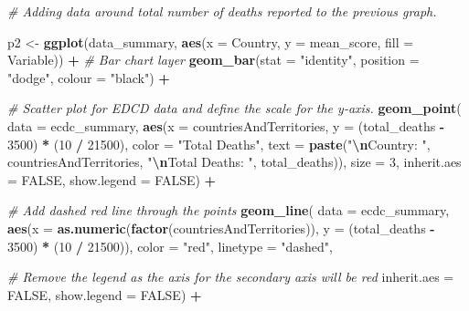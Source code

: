 \documentclass[
]{article}
\newenvironment{Shaded}{\begin{snugshade}}{\end{snugshade}}
\newcommand{\AttributeTok}[1]{\textcolor[rgb]{0.13,0.29,0.53}{#1}}
\newcommand{\CommentTok}[1]{\textcolor[rgb]{0.56,0.35,0.01}{\textit{#1}}}
\newcommand{\ConstantTok}[1]{\textcolor[rgb]{0.56,0.35,0.01}{#1}}
\newcommand{\DecValTok}[1]{\textcolor[rgb]{0.00,0.00,0.81}{#1}}
\newcommand{\FunctionTok}[1]{\textcolor[rgb]{0.13,0.29,0.53}{\textbf{#1}}}
\newcommand{\NormalTok}[1]{#1}
\newcommand{\OtherTok}[1]{\textcolor[rgb]{0.56,0.35,0.01}{#1}}
\newcommand{\SpecialCharTok}[1]{\textcolor[rgb]{0.81,0.36,0.00}{\textbf{#1}}}
\newcommand{\StringTok}[1]{\textcolor[rgb]{0.31,0.60,0.02}{#1}}
\begin{document}
\begin{Shaded}
\begin{Highlighting}[]
  \CommentTok{\# Adding data around total number of deaths reported to the previous graph. }

\NormalTok{p2 }\OtherTok{\textless{}{-}} \FunctionTok{ggplot}\NormalTok{(data\_summary, }\FunctionTok{aes}\NormalTok{(}\AttributeTok{x =}\NormalTok{ Country, }\AttributeTok{y =}\NormalTok{ mean\_score, }\AttributeTok{fill =}\NormalTok{ Variable)) }\SpecialCharTok{+}
  \CommentTok{\# Bar chart layer}
  \FunctionTok{geom\_bar}\NormalTok{(}\AttributeTok{stat =} \StringTok{"identity"}\NormalTok{, }\AttributeTok{position =} \StringTok{"dodge"}\NormalTok{, }\AttributeTok{colour =} \StringTok{"black"}\NormalTok{) }\SpecialCharTok{+}
  
  \CommentTok{\# Scatter plot for EDCD data and define the scale for the y{-}axis. }
  \FunctionTok{geom\_point}\NormalTok{(}
    \AttributeTok{data =}\NormalTok{ ecdc\_summary,  }
    \FunctionTok{aes}\NormalTok{(}\AttributeTok{x =}\NormalTok{ countriesAndTerritories, }\AttributeTok{y =}\NormalTok{ (total\_deaths }\SpecialCharTok{{-}} \DecValTok{3500}\NormalTok{) }\SpecialCharTok{*}\NormalTok{ (}\DecValTok{10} \SpecialCharTok{/} \DecValTok{21500}\NormalTok{), }\AttributeTok{color =} \StringTok{"Total Deaths"}\NormalTok{, }\AttributeTok{text =} \FunctionTok{paste}\NormalTok{(}\StringTok{"}\SpecialCharTok{\textbackslash{}n}\StringTok{Country: "}\NormalTok{, countriesAndTerritories, }\StringTok{"}\SpecialCharTok{\textbackslash{}n}\StringTok{Total Deaths: "}\NormalTok{, total\_deaths)),  }
    \AttributeTok{size =} \DecValTok{3}\NormalTok{,}
    \AttributeTok{inherit.aes =} \ConstantTok{FALSE}\NormalTok{,}
    \AttributeTok{show.legend =} \ConstantTok{FALSE}\NormalTok{) }\SpecialCharTok{+}
  
  \CommentTok{\# Add dashed red line through the points}
  \FunctionTok{geom\_line}\NormalTok{(}
    \AttributeTok{data =}\NormalTok{ ecdc\_summary,}
    \FunctionTok{aes}\NormalTok{(}\AttributeTok{x =} \FunctionTok{as.numeric}\NormalTok{(}\FunctionTok{factor}\NormalTok{(countriesAndTerritories)), }\AttributeTok{y =}\NormalTok{ (total\_deaths }\SpecialCharTok{{-}} \DecValTok{3500}\NormalTok{) }\SpecialCharTok{*}\NormalTok{ (}\DecValTok{10} \SpecialCharTok{/} \DecValTok{21500}\NormalTok{)),}
    \AttributeTok{color =} \StringTok{"red"}\NormalTok{,}
    \AttributeTok{linetype =} \StringTok{"dashed"}\NormalTok{,}
    
  \CommentTok{\# Remove the legend as the axis for the secondary axis will be red}
    \AttributeTok{inherit.aes =} \ConstantTok{FALSE}\NormalTok{,}
    \AttributeTok{show.legend =} \ConstantTok{FALSE}\NormalTok{) }\SpecialCharTok{+}
  

\end{Highlighting}
\end{Shaded}
\end{document}

